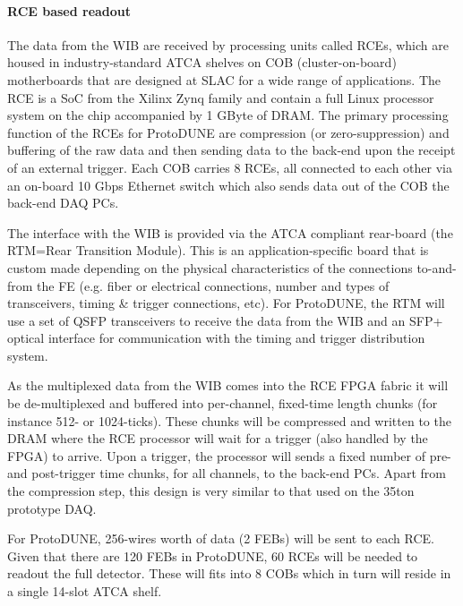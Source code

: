 \paragraph{RCE based readout}
The data from the WIB are received by processing units called RCEs, 
which are housed in industry-standard
ATCA shelves on COB (cluster-on-board) motherboards that are designed
at SLAC for a wide range of applications.   The RCE is a SoC 
from the
Xilinx Zynq family and contain a full Linux processor system on the chip
accompanied by 1 GByte of DRAM.   The primary processing function of the
RCEs for ProtoDUNE are compression (or zero-suppression) and buffering
of the raw data and then sending data to the back-end upon the receipt of
an external trigger.  Each COB carries 8 RCEs, all connected to each
other via an on-board 10 Gbps Ethernet switch which also sends data out
of the COB the back-end DAQ PCs.

The interface with the WIB is provided via the ATCA compliant rear-board
(the RTM=Rear Transition Module).  This is an application-specific board
that is custom made depending on the physical characteristics of the
connections to-and-from the FE (e.g. fiber or electrical connections,
number and types of transceivers, timing \& trigger connections, etc).
For ProtoDUNE, the RTM will use a set of QSFP transceivers to receive
the data from the WIB and an SFP+ 
 optical interface for communication
with the timing and trigger distribution system.

As the multiplexed data from the WIB comes into the RCE FPGA fabric
it will be de-multiplexed and buffered into per-channel, fixed-time
length chunks (for instance 512- or 1024-ticks).  These chunks will be
compressed and written to the DRAM where the RCE processor will wait
for a trigger (also handled by the FPGA) to arrive.  Upon a trigger, the
processor will sends a fixed number of pre- and post-trigger time chunks,
for all channels, to the back-end PCs.  Apart from the compression step,
this design is very similar to that used on the 35ton prototype DAQ.

For ProtoDUNE, 256-wires worth of data (2 FEBs) will be sent to each RCE.
Given that there are 120 FEBs in ProtoDUNE, 60 RCEs will be needed to
readout the full detector.  These will fits into 8 COBs which in turn
will reside in a single 14-slot ATCA shelf.

